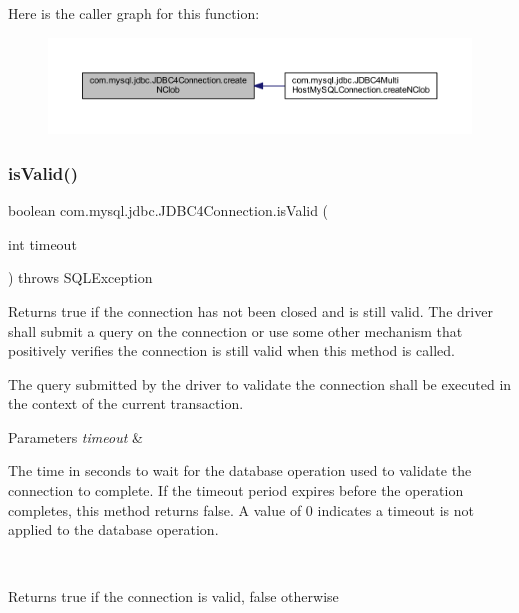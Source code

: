 Here is the caller graph for this function\+:
\nopagebreak
\begin{figure}[H]
\begin{center}
\leavevmode
\includegraphics[width=350pt]{classcom_1_1mysql_1_1jdbc_1_1_j_d_b_c4_connection_a8be144d15039acec709f079aefcbb1be_icgraph}
\end{center}
\end{figure}
\mbox{\label{classcom_1_1mysql_1_1jdbc_1_1_j_d_b_c4_connection_a983196178af2e710098d18e8f1b661d8}} 
\subsubsection{\texorpdfstring{is\+Valid()}{isValid()}}
{\footnotesize\ttfamily boolean com.\+mysql.\+jdbc.\+J\+D\+B\+C4\+Connection.\+is\+Valid (\begin{DoxyParamCaption}\item[{int}]{timeout }\end{DoxyParamCaption}) throws S\+Q\+L\+Exception}

Returns true if the connection has not been closed and is still valid. The driver shall submit a query on the connection or use some other mechanism that positively verifies the connection is still valid when this method is called. 

The query submitted by the driver to validate the connection shall be executed in the context of the current transaction.


\begin{DoxyParams}{Parameters}
{\em timeout} & 
\begin{DoxyItemize}
\item The time in seconds to wait for the database operation used to validate the connection to complete. If the timeout period expires before the operation completes, this method returns false. A value of 0 indicates a timeout is not applied to the database operation. 
\end{DoxyItemize}\\
\hline
\end{DoxyParams}
\begin{DoxyReturn}{Returns}
true if the connection is valid, false otherwise 
\end{DoxyReturn}

